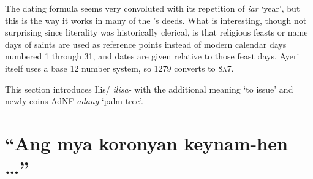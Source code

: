 \documentclass[12pt,paper=a4]{scrartcl}
\newcommand{\fw}[1]{\textit{#1}} %
\newcommand{\ayr}[1]{{\Tagati #1}}
\newcommand{\xayr}[3]{{\Tagati #1} \emph{#2} \enquote*{#3}}
\begin{document}
The dating formula seems very convoluted with its repetition of \fw{iar} `year', 
but this is the way it works in many of the 's deeds. What is 
interesting, though not surprising since literality was historically clerical, 
is that religious feasts or name days of saints are used as reference points 
instead of modern calendar days numbered 1 through 31, and dates are given 
relative to those feast days. Ayeri itself uses a base 12 number system, so 
1279 converts to \textsc{8a7}.

This section introduces \ayr{Ilis/} \fw{ilisa-} with the additional meaning 
`to issue' and newly coins \xayr{AdNF}{adang}{palm tree}.

\section{\enquote{Ang mya koronyan keynam-hen …}}
\end{document}
